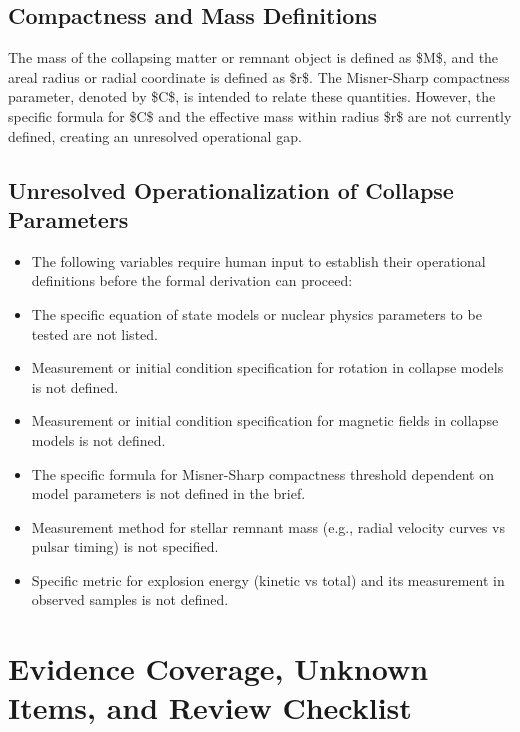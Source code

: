 \documentclass[conference]{IEEEtran}
\begin{document}
\subsection{Compactness and Mass Definitions}
The mass of the collapsing matter or remnant object is defined as \$M\$, and the areal radius or radial coordinate is defined as \$r\$. The Misner-Sharp compactness parameter, denoted by \$C\$, is intended to relate these quantities. However, the specific formula for \$C\$ and the effective mass within radius \$r\$ are not currently defined, creating an unresolved operational gap.

\subsection{Unresolved Operationalization of Collapse Parameters}
\begin{itemize}
\item The following variables require human input to establish their operational definitions before the formal derivation can proceed:
\item The specific equation of state models or nuclear physics parameters to be tested are not listed.
\item Measurement or initial condition specification for rotation in collapse models is not defined.
\item Measurement or initial condition specification for magnetic fields in collapse models is not defined.
\item The specific formula for Misner-Sharp compactness threshold dependent on model parameters is not defined in the brief.
\item Measurement method for stellar remnant mass (e.g., radial velocity curves vs pulsar timing) is not specified.
\item Specific metric for explosion energy (kinetic vs total) and its measurement in observed samples is not defined.
\end{itemize}

\section{Evidence Coverage, Unknown Items, and Review Checklist}
\end{document}
